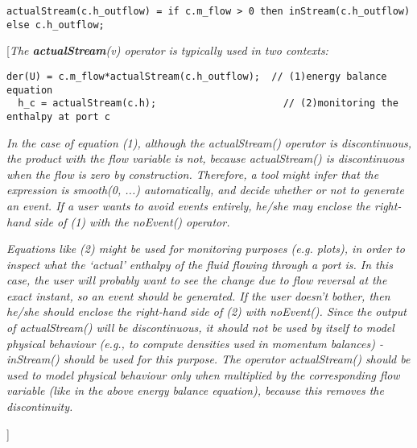 \begin{lstlisting}[language=modelica]
actualStream(c.h_outflow) = if c.m_flow > 0 then inStream(c.h_outflow) else c.h_outflow;
\end{lstlisting}

{[}\emph{The \textbf{actualStream}(v) operator is typically used in two
contexts:}
\begin{lstlisting}[language=modelica]
  der(U) = c.m_flow*actualStream(c.h_outflow);  // (1)energy balance equation
  h_c = actualStream(c.h);                      // (2)monitoring the enthalpy at port c
\end{lstlisting}
\emph{In the case of equation (1), although the actualStream() operator
is discontinuous, the product with the flow variable is not, because
actualStream() is discontinuous when the flow is zero by construction.
Therefore, a tool might infer that the expression is smooth(0, ...)
automatically, and decide whether or not to generate an event. If a user
wants to avoid events entirely, he/she may enclose the right-hand side
of (1) with the noEvent() operator. }

\emph{Equations like (2) might be used for monitoring purposes (e.g.
plots), in order to inspect what the `actual' enthalpy of the fluid
flowing through a port is. In this case, the user will probably want to
see the change due to flow reversal at the exact instant, so an event
should be generated. If the user doesn't bother, then he/she should
enclose the right-hand side of (2) with noEvent(). Since the output of
actualStream() will be discontinuous, it should not be used by itself to
model physical behaviour (e.g., to compute densities used in momentum
balances) - inStream() should be used for this purpose. The operator
actualStream() should be used to model physical behaviour only when
multiplied by the corresponding flow variable (like in the above energy
balance equation), because this removes the discontinuity.}

{]}
